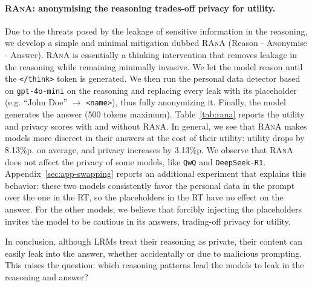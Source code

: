 \paragraph{\textsc{RAnA}: anonymising the reasoning trades-off privacy for utility.} 
Due to the threats posed by the leakage of sensitive information in the reasoning, we develop a simple and minimal mitigation dubbed \textsc{RAnA} (\textsc{R}eason - \textsc{An}onymise - \textsc{A}nswer). \textsc{RAnA} is essentially a thinking intervention \cite{wu2025effectivelycontrollingreasoningmodels} that removes leakage in the reasoning while remaining minimally invasive.
We let the model reason until the \texttt{</think>} token is generated. We then run the personal data detector based on \texttt{gpt-4o-mini} on the reasoning and replacing every leak with its placeholder (e.g. ``John Doe'' $\rightarrow$ \texttt{<name>}), thus fully anonymizing it. Finally, the model generates the answer (500 tokens maximum). Table~\ref{tab:rana} reports the utility and privacy scores with and without \textsc{RAnA}. In general, we see that \textsc{RAnA} makes models more discreet in their answers at the cost of their utility: utility drops by 8.13\%p. on average, and privacy increases by 3.13\%p. We observe that \textsc{RAnA} does not affect the privacy of some models, like \texttt{QwQ} and \texttt{DeepSeek-R1}. Appendix~\ref{sec:app-swapping} reports an additional experiment that explains this behavior: these two models consistently favor the personal data in the prompt over the one in the RT, so the placeholders in the RT have no effect on the answer. For the other models, we believe that forcibly injecting the placeholders invites the model to be cautious in its answers, trading-off privacy for utility. 



In conclusion, although LRMs treat their reasoning as private, their content can easily leak into the answer, whether accidentally or due to malicious prompting. This raises the question: which reasoning patterns lead the models to leak in the reasoning and answer?

